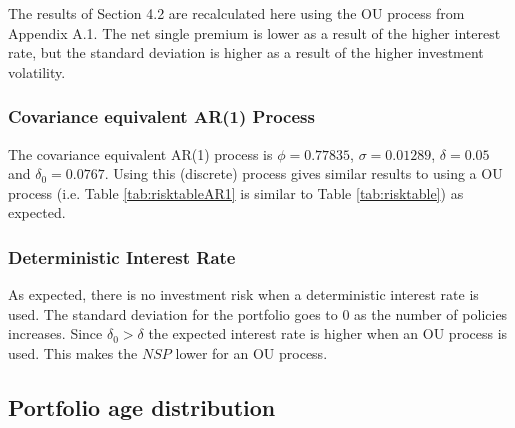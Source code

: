 \documentclass[12pt]{article}
\begin{document}
\begin{appendices}
The results of Section 4.2 are recalculated here using the OU process  from Appendix A.1. The net single premium is lower as a result of the higher interest rate, but the standard deviation is higher as a result of the higher investment volatility.



\subsubsection{Covariance equivalent AR(1) Process}

The covariance equivalent AR(1) process is $\phi = 0.77835$, $\sigma = 0.01289$, $\delta = 0.05$ and $\delta_{0} = 0.0767$. Using this (discrete) process gives similar results to using a OU process (i.e. Table \ref{tab:risktableAR1} is similar to Table \ref{tab:risktable}) as expected.



\subsubsection{Deterministic Interest Rate}

As expected, there is no investment risk when a deterministic interest rate is used. The standard deviation for the portfolio goes to 0 as the number of policies increases. Since $\delta_{0} > \delta$ the expected interest rate is higher when an OU process is used. This makes the $NSP$ lower for an OU process.



\newpage

\subsection{Portfolio age distribution}


\end{appendices}
\end{document}

